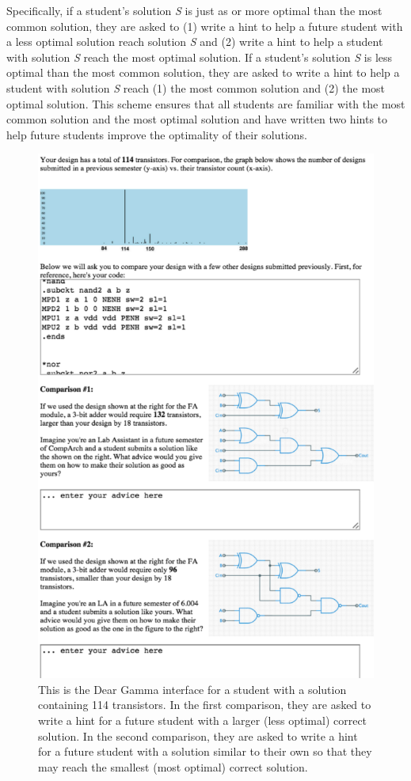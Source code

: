 Specifically, if a student's solution {\it S} is just as or more optimal than the most common solution, they are asked to (1) write a hint to help a future student with a less optimal solution reach solution {\it S} and (2) write a hint to help a student with solution {\it S} reach the most optimal solution. If a student's solution {\it S} is less optimal than the most common solution, they are asked to write a hint to help a student with solution {\it S} reach (1) the most common solution and (2) the most optimal solution. This scheme ensures that all students are familiar with the most common solution and the most optimal solution and have written two hints to help future students improve the optimality of their solutions. 

\begin{figure}
\centering
\includegraphics[width=0.70\columnwidth]{Body/figures/classoverflow/deargamma_shortened.png}
\caption{This is the Dear Gamma interface for a student with a solution containing 114 transistors. In the first comparison, they are asked to write a hint for a future student with a larger (less optimal) correct solution. In the second comparison, they are asked to write a hint for a future student with a solution similar to their own so that they may reach the smallest (most optimal) correct solution.}
\label{fig:deargamma}
\end{figure}

